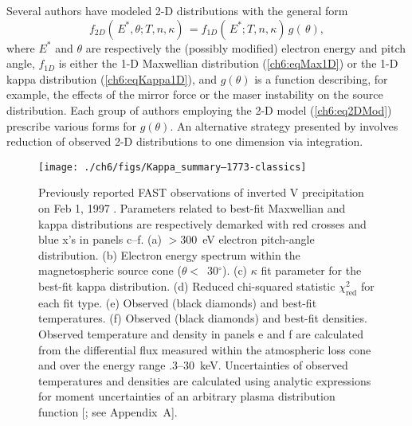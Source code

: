   Several authors \citep{Maggs1981,Bingham1999,Bingham2000,Mutel2007} have
  modeled 2-D distributions with the general form
    \begin{equation} \label{ch6:eq2DMod} f_{2D}(\, E^*, \theta ; T, n,
      \kappa) \, = f_{1D}(\, E^*; T, n, \kappa) \, g(\, \theta),
    \end{equation}
    where $E^*$ and $\theta$ are respectively the (possibly modified)
    electron energy and pitch angle, $f_{1D}$ is either the 1-D
    Maxwellian distribution (\ref{ch6:eqMax1D}) or the 1-D kappa
    distribution (\ref{ch6:eqKappa1D}), and $g(\theta )$ is a function
    describing, for example, the effects of the mirror force or the
    maser instability on the source distribution. Each group of
    authors employing the 2-D model (\ref{ch6:eq2DMod}) prescribe
    various forms for $g(\theta)$.  An alternative strategy presented
    by \citet{Pritchett1999} involves reduction of observed 2-D
    distributions to one dimension via integration.


  \begin{figure}
    \centering
    \noindent\texttt{[image: ./ch6/figs/Kappa\_summary--1773-classics]}
    \caption[Inverted V precipitation observed by FAST during Orbit 1773, and best-fit
    Maxwellian and kappa distribution parameters]{Previously reported
      FAST observations of inverted V precipitation on Feb 1, 1997
      \citep{Elphic1998}. Parameters related to best-fit Maxwellian
      and kappa distributions are respectively demarked with red
      crosses and blue x's in panels c--f. (a) $>$300~eV electron
      pitch-angle distribution. (b) Electron energy spectrum within
      the magnetospheric source cone ($\theta$$<$~30$^\circ$). (c)
      $\kappa$ fit parameter for the best-fit kappa distribution. (d)
      Reduced chi-squared statistic $\chi^2_{\mathrm{red}}$ for each
      fit type. (e) Observed (black diamonds) and best-fit
      temperatures. (f) Observed (black diamonds) and best-fit
      densities. Observed temperature and density in panels e and f
      are calculated from the differential flux measured within the
      atmospheric loss cone and over the energy range
      .3--30~keV. Uncertainties of observed temperatures and densities
      are calculated using analytic expressions for moment
      uncertainties of an arbitrary plasma distribution function
      [\citealt{Gershman2015}; see Appendix~A].}
    \label{ch6:Fig1}
  \end{figure}

